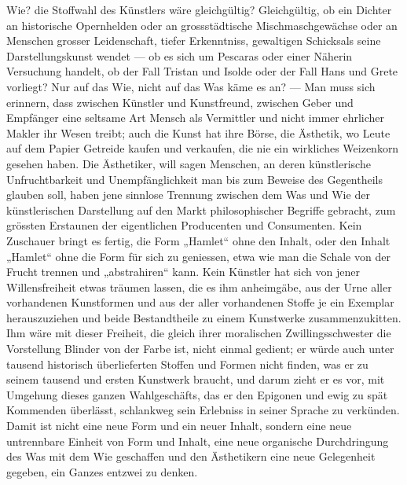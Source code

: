 Wie? die Stoffwahl des Künstlers wäre gleichgültig? Gleichgültig, ob ein Dichter an historische Opernhelden oder an grossstädtische Mischmaschgewächse oder an Menschen grosser Leidenschaft, tiefer Erkenntniss, gewaltigen Schicksals seine Darstellungskunst wendet — ob es sich um Pescaras oder einer Näherin Versuchung handelt, ob der Fall Tristan und Isolde oder der Fall Hans und Grete vorliegt? Nur auf das Wie, nicht auf das Was käme es an? — Man muss sich erinnern, dass zwischen Künstler und Kunstfreund, zwischen Geber und Empfänger eine seltsame Art Mensch als Vermittler und nicht immer ehrlicher Makler ihr Wesen treibt; auch die Kunst hat ihre Börse, die Ästhetik, wo Leute auf dem Papier Getreide kaufen und verkaufen, die nie ein wirkliches Weizenkorn gesehen haben. Die Ästhetiker, will sagen Menschen, an deren künstlerische Unfruchtbarkeit und Unempfänglichkeit man bis zum Beweise des Gegentheils glauben soll, haben jene sinnlose Trennung zwischen dem Was und Wie der künstlerischen Darstellung auf den Markt philosophischer Begriffe gebracht, zum grössten Erstaunen der eigentlichen Producenten und Consumenten. Kein Zuschauer bringt es fertig, die Form „Hamlet“ ohne den Inhalt, oder den Inhalt „Hamlet“ ohne die Form für sich zu geniessen, etwa wie man die Schale von der Frucht trennen und „abstrahiren“ kann. Kein Künstler hat sich von jener Willensfreiheit etwas träumen lassen, die es ihm anheimgäbe, aus der Urne aller vorhandenen Kunstformen und aus der aller vorhandenen Stoffe je ein Exemplar herauszuziehen und beide Bestandtheile zu einem Kunstwerke zusammenzukitten. Ihm wäre mit dieser Freiheit, die gleich ihrer moralischen Zwillingsschwester die Vorstellung Blinder von der Farbe ist, nicht einmal gedient; er würde auch unter tausend historisch überlieferten Stoffen und Formen nicht finden, was er zu seinem tausend und ersten Kunstwerk braucht, und darum zieht er es vor, mit Umgehung dieses ganzen Wahlgeschäfts, das er den Epigonen und ewig zu spät Kommenden überlässt, schlankweg sein Erlebniss in seiner Sprache zu verkünden. Damit ist nicht eine neue Form und ein neuer Inhalt, sondern eine neue untrennbare Einheit von Form und Inhalt, eine neue organische Durchdringung des Was mit dem Wie geschaffen und den Ästhetikern eine neue Gelegenheit gegeben, ein Ganzes entzwei zu denken.
\par


